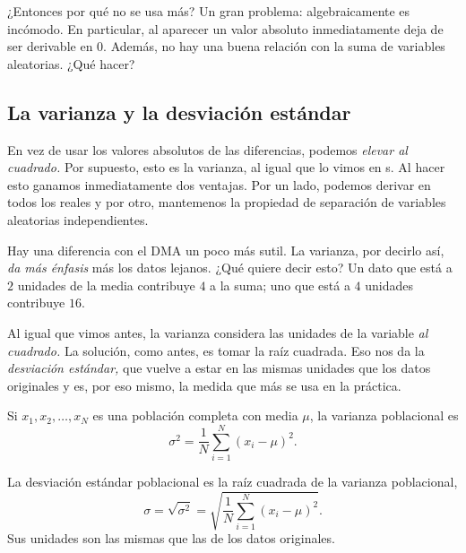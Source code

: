 
¿Entonces por qué no se usa más? Un gran problema: algebraicamente es incómodo. En particular, al aparecer un valor absoluto inmediatamente deja de ser derivable en \(0\). Además, no hay una buena relación con la suma de variables aleatorias. ¿Qué hacer?


\subsection{La varianza y la desviación estándar}

En vez de usar los valores absolutos de las diferencias, podemos \emph{elevar al cuadrado.}  Por supuesto, esto es la varianza, al igual que lo vimos en \va s. Al hacer esto ganamos inmediatamente dos ventajas. Por un lado, podemos derivar en todos los reales y por otro, mantemenos la propiedad de separación de variables aleatorias independientes.

Hay una diferencia con el  DMA un poco más sutil. La varianza, por decirlo así, \emph{da más énfasis} más los datos lejanos. ¿Qué quiere decir esto? Un dato que está a \(2\) unidades de la media contribuye \(4\) a la suma; uno que está a \(4\) unidades contribuye \(16\). 

Al igual que vimos antes, la varianza considera las unidades de la variable \emph{al cuadrado.} La solución, como antes, es tomar la raíz cuadrada. Eso nos da la \emph{desviación estándar,} que vuelve a estar en las mismas unidades que los datos originales y es, por eso mismo, la medida que más se usa en la práctica.

\formal
\begin{definition}
Si \(x_1, x_2, \ldots, x_N\) es una población completa con media \(\mu\), la varianza poblacional es
\[\sigma^2 = \frac{1}{N}\sum_{i=1}^{N}(x_i - \mu)^2.\]
\end{definition}

\begin{definition}
La desviación estándar poblacional es la raíz cuadrada de la varianza poblacional,
\[\sigma = \sqrt{\sigma^2} = \sqrt{\frac{1}{N}\sum_{i=1}^{N}(x_i - \mu)^2}.\]
Sus unidades son las mismas que las de los datos originales.
\end{definition}

